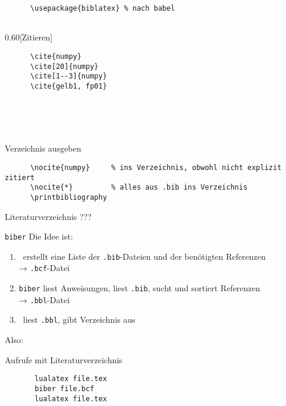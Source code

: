 \begin{frame}[fragile]{%
  \BibLaTeX{}%
  \hfill%
}
  \begin{Packages}
    \begin{lstlisting}
      \usepackage{biblatex} % nach babel
      
    \end{lstlisting}
  \end{Packages}
  \begin{CodeExample}{0.60}[Zitieren]
    \begin{lstlisting}
      \cite{numpy}
      \cite[20]{numpy}
      \cite[1--3]{numpy}
      \cite{gelb1, fp01}
    \end{lstlisting}
  \CodeResult
    \cite{numpy} \\
    \cite[20]{numpy} \\
    \cite[1--3]{numpy} \\
    \cite{gelb1, fp01}
  \end{CodeExample}
  \begin{block}{Verzeichnis ausgeben}
    \begin{lstlisting}
      \nocite{numpy}     % ins Verzeichnis, obwohl nicht explizit zitiert
      \nocite{*}         % alles aus .bib ins Verzeichnis
      \printbibliography
    \end{lstlisting}
  \end{block}
\end{frame}

\begin{frame}{Literaturverzeichnis}
  \centering
  \pause
  \Huge ???
\end{frame}

\begin{frame}[fragile]{
  \texttt{biber}
  \hfill
}
  Die Idee ist:
  \begin{enumerate}
    \item \BibLaTeX\ erstellt eine Liste der \texttt{.bib}-Dateien und der benötigten Referenzen \\
      → \texttt{.bcf}-Datei
    \item \texttt{biber} liest Anweisungen, liest \texttt{.bib}, sucht und sortiert Referenzen \\
      → \texttt{.bbl}-Datei
    \item \BibLaTeX\ liest \texttt{.bbl}, gibt Verzeichnis aus
  \end{enumerate}

  \vspace{10pt}
  Also:
  \begin{block}{Aufrufe mit Literaturverzeichnis}
    \begin{lstlisting}
       lualatex file.tex
       biber file.bcf
       lualatex file.tex
    \end{lstlisting}
  \end{block}
\end{frame}

